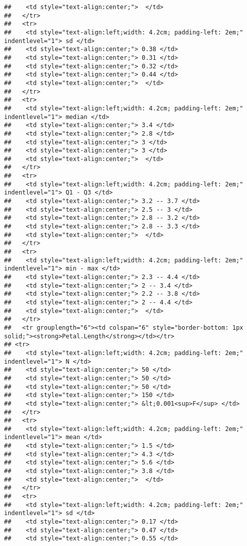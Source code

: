 \documentclass[
]{article}
\begin{document}
\begin{verbatim}
##    <td style="text-align:center;">  </td>
##   </tr>
##   <tr>
##    <td style="text-align:left;width: 4.2cm; padding-left: 2em;" indentlevel="1"> sd </td>
##    <td style="text-align:center;"> 0.38 </td>
##    <td style="text-align:center;"> 0.31 </td>
##    <td style="text-align:center;"> 0.32 </td>
##    <td style="text-align:center;"> 0.44 </td>
##    <td style="text-align:center;">  </td>
##   </tr>
##   <tr>
##    <td style="text-align:left;width: 4.2cm; padding-left: 2em;" indentlevel="1"> median </td>
##    <td style="text-align:center;"> 3.4 </td>
##    <td style="text-align:center;"> 2.8 </td>
##    <td style="text-align:center;"> 3 </td>
##    <td style="text-align:center;"> 3 </td>
##    <td style="text-align:center;">  </td>
##   </tr>
##   <tr>
##    <td style="text-align:left;width: 4.2cm; padding-left: 2em;" indentlevel="1"> Q1 - Q3 </td>
##    <td style="text-align:center;"> 3.2 -- 3.7 </td>
##    <td style="text-align:center;"> 2.5 -- 3 </td>
##    <td style="text-align:center;"> 2.8 -- 3.2 </td>
##    <td style="text-align:center;"> 2.8 -- 3.3 </td>
##    <td style="text-align:center;">  </td>
##   </tr>
##   <tr>
##    <td style="text-align:left;width: 4.2cm; padding-left: 2em;" indentlevel="1"> min - max </td>
##    <td style="text-align:center;"> 2.3 -- 4.4 </td>
##    <td style="text-align:center;"> 2 -- 3.4 </td>
##    <td style="text-align:center;"> 2.2 -- 3.8 </td>
##    <td style="text-align:center;"> 2 -- 4.4 </td>
##    <td style="text-align:center;">  </td>
##   </tr>
##   <tr grouplength="6"><td colspan="6" style="border-bottom: 1px solid;"><strong>Petal.Length</strong></td></tr>
## <tr>
##    <td style="text-align:left;width: 4.2cm; padding-left: 2em;" indentlevel="1"> N </td>
##    <td style="text-align:center;"> 50 </td>
##    <td style="text-align:center;"> 50 </td>
##    <td style="text-align:center;"> 50 </td>
##    <td style="text-align:center;"> 150 </td>
##    <td style="text-align:center;"> &lt;0.001<sup>F</sup> </td>
##   </tr>
##   <tr>
##    <td style="text-align:left;width: 4.2cm; padding-left: 2em;" indentlevel="1"> mean </td>
##    <td style="text-align:center;"> 1.5 </td>
##    <td style="text-align:center;"> 4.3 </td>
##    <td style="text-align:center;"> 5.6 </td>
##    <td style="text-align:center;"> 3.8 </td>
##    <td style="text-align:center;">  </td>
##   </tr>
##   <tr>
##    <td style="text-align:left;width: 4.2cm; padding-left: 2em;" indentlevel="1"> sd </td>
##    <td style="text-align:center;"> 0.17 </td>
##    <td style="text-align:center;"> 0.47 </td>
##    <td style="text-align:center;"> 0.55 </td>

\end{verbatim}
\end{document}
